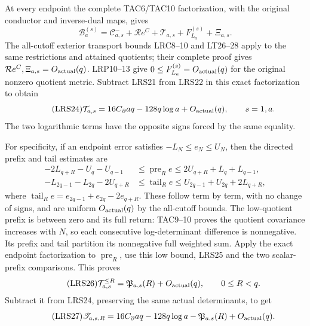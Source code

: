 At every endpoint the complete TAC6/TAC10 factorization, with the
original conductor and inverse-dual maps, gives
\[
 \mathcal B_a^{(s)}=
 \mathcal C^-_{a,s}+\mathcal R e^C
      +\mathcal T_{a,s}+F_{L_a}^{(s)}+\Xi_{a,s}.
\]
The all-cutoff exterior transport bounds LRC8--10 and LT26--28 apply to the same
restrictions and attained quotients; their complete proof gives
$\mathcal R e^C,\Xi_{a,s}=O_{\rm actual}(q)$.
LRP10--13 give $0\le F_{L_a}^{(s)}=O_{\rm actual}(q)$ for the
original nonzero quotient metric.  Subtract LRS21 from LRS22 in
this exact factorization to obtain
\begin{equation}\tag{LRS24}
 \mathcal T_{a,s}=16C_\partial aq-128q\log a+O_{\rm actual}(q),
 \qquad s=1,a.
\end{equation}
The two logarithmic terms have the opposite signs forced by the
same equality.

For specificity, if an endpoint error satisfies $-L_N\le e_N\le U_N$,
then the directed prefix and tail estimates are
\begin{equation}\tag{LRS25}
\begin{split}
 -2L_{q+R}-U_q-U_{q-1}
 &\le\operatorname{pre}_Re\le2U_{q+R}+L_q+L_{q-1},\\
 -L_{2q-1}-L_{2q}-2U_{q+R}
 &\le\operatorname{tail}_Re
       \le U_{2q-1}+U_{2q}+2L_{q+R},
\end{split}
\end{equation}
where $\operatorname{tail}_Re=e_{2q-1}+e_{2q}-2e_{q+R}$.
These follow term by term, with no change of signs, and are uniform
$O_{\rm actual}(q)$ by the all-cutoff bounds.  The low-quotient
prefix is between zero and its full return: TAC9--10 proves the
quotient covariance increases with $N$, so each consecutive
log-determinant difference is nonnegative.  Its prefix and tail
partition its nonnegative full weighted sum.  Apply the exact
endpoint factorization to $\operatorname{pre}_R$, use this low bound,
LRS25 and the two scalar-prefix comparisons.  This proves
\begin{equation}\tag{LRS26}
 \mathcal T_{a,s}^{\le R}=\mathfrak P_{a,s}(R)+O_{\rm actual}(q),
 \qquad 0\le R<q.
\end{equation}
Subtract it from LRS24, preserving the same actual determinants, to get
\begin{equation}\tag{LRS27}
 \mathscr T_{a,s,R}=16C_\partial aq-128q\log a
                     -\mathfrak P_{a,s}(R)+O_{\rm actual}(q).
\end{equation}

